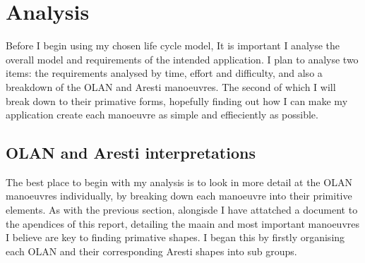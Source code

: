\section{Analysis}
Before I begin using my chosen life cycle model, It is important I analyse the overall model and requirements of the intended application. I plan to analyse two items: the requirements analysed by time, effort and difficulty, and also a breakdown of the OLAN and Aresti manoeuvres. The second of which I will break down to their primative forms, hopefully finding out how I can make my application create each manoeuvre as simple and effieciently as possible.

\subsection{OLAN and Aresti interpretations}
The best place to begin with my analysis is to look in more detail at the OLAN manoeuvres individually, by breaking down each manoeuvre into their primitive elements. As with the previous section, alongisde I have attatched a document to the apendices of this report, detailing the maain and most important manoeuvres I believe are key to finding primative shapes. I began this by firstly organising each OLAN and their corresponding Aresti shapes into sub groups. 


